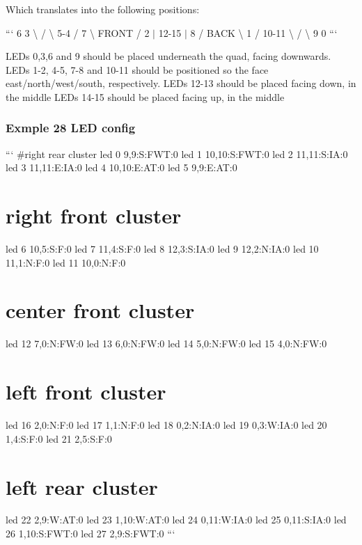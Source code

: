 Which translates into the following positions\+:

``` 6 3 \textbackslash{} / \textbackslash{} 5-\/4 / 7 \textbackslash{} F\+R\+O\+N\+T / 2 $\vert$ 12-\/15 $\vert$ 8 / B\+A\+C\+K \textbackslash{} 1 / 10-\/11 \textbackslash{} / \textbackslash{} 9 0 ```

L\+E\+Ds 0,3,6 and 9 should be placed underneath the quad, facing downwards. L\+E\+Ds 1-\/2, 4-\/5, 7-\/8 and 10-\/11 should be positioned so the face east/north/west/south, respectively. L\+E\+Ds 12-\/13 should be placed facing down, in the middle L\+E\+Ds 14-\/15 should be placed facing up, in the middle

\subsubsection*{Exmple 28 L\+E\+D config}

``` \#right rear cluster led 0 9,9\+:S\+:\+F\+W\+T\+:0 led 1 10,10\+:S\+:\+F\+W\+T\+:0 led 2 11,11\+:S\+:\+I\+A\+:0 led 3 11,11\+:E\+:\+I\+A\+:0 led 4 10,10\+:E\+:\+A\+T\+:0 led 5 9,9\+:E\+:\+A\+T\+:0 \section*{right front cluster}

led 6 10,5\+:S\+:\+F\+:0 led 7 11,4\+:S\+:\+F\+:0 led 8 12,3\+:S\+:\+I\+A\+:0 led 9 12,2\+:N\+:\+I\+A\+:0 led 10 11,1\+:N\+:\+F\+:0 led 11 10,0\+:N\+:\+F\+:0 \section*{center front cluster}

led 12 7,0\+:N\+:\+F\+W\+:0 led 13 6,0\+:N\+:\+F\+W\+:0 led 14 5,0\+:N\+:\+F\+W\+:0 led 15 4,0\+:N\+:\+F\+W\+:0 \section*{left front cluster}

led 16 2,0\+:N\+:\+F\+:0 led 17 1,1\+:N\+:\+F\+:0 led 18 0,2\+:N\+:\+I\+A\+:0 led 19 0,3\+:W\+:\+I\+A\+:0 led 20 1,4\+:S\+:\+F\+:0 led 21 2,5\+:S\+:\+F\+:0 \section*{left rear cluster}

led 22 2,9\+:W\+:\+A\+T\+:0 led 23 1,10\+:W\+:\+A\+T\+:0 led 24 0,11\+:W\+:\+I\+A\+:0 led 25 0,11\+:S\+:\+I\+A\+:0 led 26 1,10\+:S\+:\+F\+W\+T\+:0 led 27 2,9\+:S\+:\+F\+W\+T\+:0 ```


